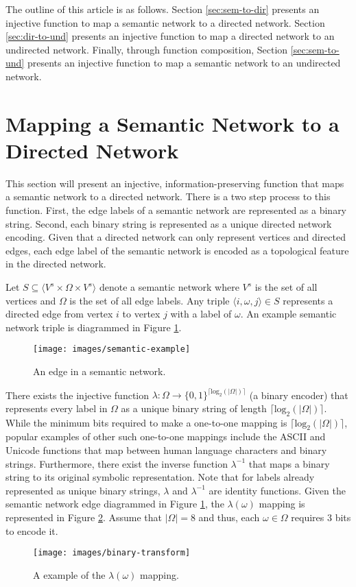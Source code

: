 \documentclass[twocolumn,preprintnumbers,amsmath,amssymb,letter]{revtex4}
\newcommand{\rar}{\rightarrow}
\newcommand{\ra}{\rangle}
\newcommand{\la}{\langle}
\begin{document}
The outline of this article is as follows. Section \ref{sec:sem-to-dir} presents an injective function to map a semantic network to a directed network. Section \ref{sec:dir-to-und} presents an injective function to map a directed network to an undirected network. Finally, through function composition, Section \ref{sec:sem-to-und} presents an injective function to map a semantic network to an undirected network.

\section{Mapping a Semantic Network to a Directed Network\label{sec:sem-to-dir}}

This section will present an injective, information-preserving function that maps a semantic network to a directed network. There is a two step process to this function. First, the edge labels of a semantic network are represented as a binary string. Second, each binary string is represented as a unique directed network encoding. Given that a directed network can only represent vertices and directed edges, each edge label of the semantic network is encoded as a topological feature in the directed network.

Let $S \subseteq \la V^s \times \Omega \times V^s \ra$ denote a semantic network where $V^s$ is the set of all vertices and $\Omega$ is the set of all edge labels. Any triple $\la i, \omega, j \ra \in S$ represents a directed edge from vertex $i$ to vertex $j$ with a label of $\omega$.  An example semantic network triple is diagrammed in Figure \ref{fig:semantic-example}.
\begin{figure}[h!]
	\centering
	\texttt{[image: images/semantic-example]}
	 \caption{\label{fig:semantic-example}An edge in a semantic network.}
\end{figure}

There exists the injective function $\lambda: \Omega \rar \{0,1\}^{\lceil\text{log}_2(|\Omega|)\rceil}$ (a binary encoder) that represents every label in $\Omega$ as a unique binary string of length $\lceil\text{log}_2(|\Omega|)\rceil$. While the minimum bits required to make a one-to-one mapping is $\lceil\text{log}_2(|\Omega|)\rceil$, popular examples of other such one-to-one mappings include the ASCII and Unicode functions that map between human language characters and binary strings. Furthermore, there exist the inverse function $\lambda^{-1}$ that maps a binary string to its original symbolic representation. Note that for labels already represented as unique binary strings, $\lambda$ and $\lambda^{-1}$ are identity functions. Given the semantic network edge diagrammed in Figure \ref{fig:semantic-example}, the $\lambda(\omega)$ mapping is represented in Figure \ref{fig:binary-transform}. Assume that $|\Omega| = 8$ and thus, each $\omega \in \Omega$ requires $3$ bits to encode it.
\begin{figure}[h!]
	\centering
	\texttt{[image: images/binary-transform]}
	 \caption{\label{fig:binary-transform}A example of the $\lambda(\omega)$ mapping.}
\end{figure}
\end{document}
